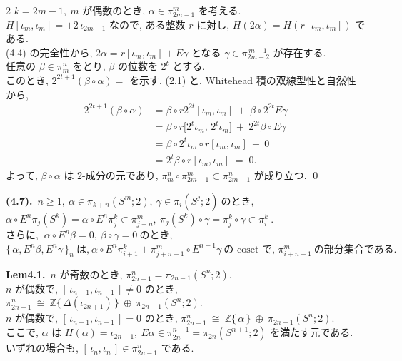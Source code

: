 \documentclass[10pt, leqno]{ltjsarticle}
\newcommand{\todai}[2][]{\{\,#2\,\}_{#1}}      %
\newcommand{\gen}[1]{\{\,#1\,\}}       %
\newcommand{\pis}[2]{\pi_{#1}(#2)}       %
\newcommand{\pit}[2]{\pi_{#1}^{#2}}
\numberwithin{equation}{section}
\theoremstyle{plain}
\theoremstyle{definition}
\theoremstyle{remark}
\begin{document}
\begin{paracol}{2}
$k=2m-1,\ m$ が偶数のとき, 
$\alpha\in\pit{2m-1}{m}$ を考える. \\
$H[\iota_m,\iota_m] = \pm 2\,\iota_{2m-1}$ なので, ある整数 $r$ に対し,
$H(2\alpha)=H(r[\iota_m,\iota_m])$ である. \\
(4.4) の完全性から, 
\(2\alpha=r[\iota_m,\iota_m]+E\gamma\)
となる $\gamma\in\pit{2m-2}{\,m-1}$ が存在する. \\
任意の $\beta\in\pit{m}{n}$ をとり, 
$\beta$ の位数を $2^{t}$ とする. \\
このとき, \(2^{2t+1}(\beta\circ\alpha) = \) を示す. 
(2.1) と, Whitehead 積の双線型性と自然性 \cite{Whitehead1941} から, 
\[
\begin{aligned}
2^{2t+1}(\beta\circ\alpha)
&=\beta\circ r 2^{2t}[\iota_m,\iota_m]
\ +\ \beta\circ 2^{2t}E\gamma\\
&=\beta\circ r\bigl[2^{t}\iota_m,\,2^{t}\iota_m\bigr]\ +\ 2^{2t}\beta\circ E\gamma\\
&=\beta\circ 2^{t}\iota_m\circ r[\iota_m,\iota_m]\ +\ 0\\
&= 2^{t}\beta\circ r[\iota_m,\iota_m]\;=\;0 .
\end{aligned}
\]
よって, $\beta\circ\alpha$ は $2$-成分の元であり, 
$\pit{m}{n}\circ\pit{2m-1}{m}\subset\pit{2m-1}{n}$ が成り立つ. 
\qed

\switchcolumn

\noindent
\textbf{(4.7).}\
\(n\ge1, \ \alpha\in\pis{k+n}{S^m; 2},\ \gamma\in\pis{i}{S^j; 2}
    \ \text{のとき, }\)\\
\(\alpha\circ E^n\pis{j}{S^k} = \alpha\circ E^n \pit{j}{k}
  \subset \pit{j+n}{m},
  \ \pis{j}{S^k}\circ\gamma = \pit{j}{k}\circ\gamma \subset\pit{i}{k}\ . \)\\
\(\text{さらに, }\ \alpha\circ E^n\beta=0,\ \beta\circ\gamma = 0 \ \text{のとき, }\)\\
\(\todai[n]{\alpha, E^n\beta, E^n\gamma}\ \text{は,}\
  \alpha\circ E^n\pit{i+1}{k} + \pit{j+n+1}{m}\circ E^{n+1}\gamma\
  \text{の coset で, }\pit{i+n+1}{m} \ \text{の部分集合である. }\)

\noindent
\textbf{Lem4.1.}\
$n$ が奇数のとき,  $\pi_{2n-1}^n=\pis{2n-1}{S^n;2} .$\\
$n$ が偶数で, $[\,\iota_{n-1},\iota_{n-1}\,]\ne0$ のとき, 
\(
\pi_{2n-1}^n\ \cong\ \mathbb{Z}\gen{\Delta(\iota_{2n+1})}\ \oplus \ 
\pis{2n-1}{S^n;2} .
\)\\
$n$ が偶数で, $[\,\iota_{n-1},\iota_{n-1}\,]=0$ のとき, 
\(
\pi_{2n-1}^n\ \cong\ \mathbb{Z}\gen{\alpha}\ \oplus \
\pis{2n-1}{S^n;2} .
\)\\
ここで, \(\alpha\) は 
\(H(\alpha)=\iota_{2n-1},\ E\alpha\in\pi_{2n}^{n+1}=\pi_{2n}(S^{n+1};2)\)
を満たす元である. \\
いずれの場合も, $[\,\iota_n,\iota_n\,]\in \pi_{2n-1}^n$ である. 


\end{paracol}
\end{document}
